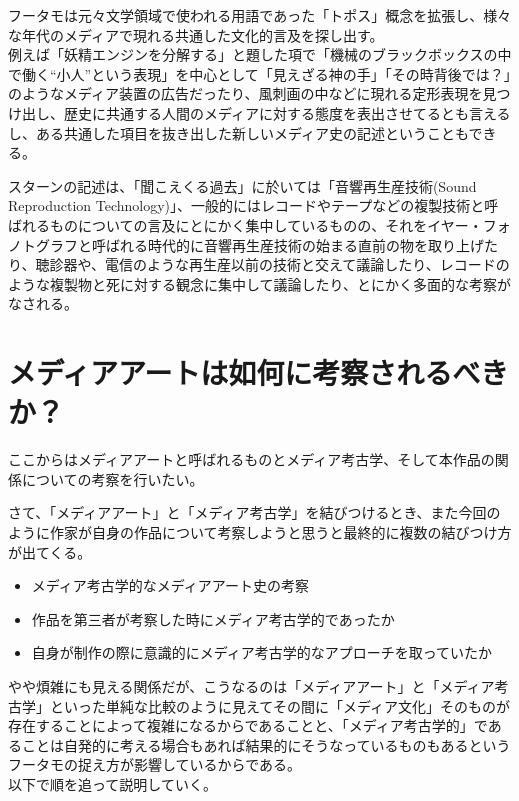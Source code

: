 \documentclass[a4paper,report]{jsbook}
\begin{document}
フータモは元々文学領域で使われる用語であった「トポス」概念を拡張し、様々な年代のメディアで現れる共通した文化的言及を探し出す。\\
例えば「妖精エンジンを分解する」と題した項で「機械のブラックボックスの中で働く``小人''という表現」を中心として「見えざる神の手」「その時背後では？」のようなメディア装置の広告だったり、風刺画の中などに現れる定形表現を見つけ出し、歴史に共通する人間のメディアに対する態度を表出させてるとも言えるし、ある共通した項目を抜き出した新しいメディア史の記述ということもできる。

スターンの記述は、「聞こえくる過去」に於いては「音響再生産技術(Sound
Reproduction
Technology)」、一般的にはレコードやテープなどの複製技術と呼ばれるものについての言及にとにかく集中しているものの、それをイヤー・フォノトグラフと呼ばれる時代的に音響再生産技術の始まる直前の物を取り上げたり、聴診器や、電信のような再生産以前の技術と交えて議論したり、レコードのような複製物と死に対する観念に集中して議論したり、とにかく多面的な考察がなされる。

\section{メディアアートは如何に考察されるべきか？}\label{ux30e1ux30c7ux30a3ux30a2ux30a2ux30fcux30c8ux306fux5982ux4f55ux306bux8003ux5bdfux3055ux308cux308bux3079ux304dux304b}

ここからはメディアアートと呼ばれるものとメディア考古学、そして本作品の関係についての考察を行いたい。

さて、「メディアアート」と「メディア考古学」を結びつけるとき、また今回のように作家が自身の作品について考察しようと思うと最終的に複数の結びつけ方が出てくる。

\begin{itemize}
\tightlist
\item
  メディア考古学的なメディアアート史の考察
\item
  作品を第三者が考察した時にメディア考古学的であったか
\item
  自身が制作の際に意識的にメディア考古学的なアプローチを取っていたか
\end{itemize}

やや煩雑にも見える関係だが、こうなるのは「メディアアート」と「メディア考古学」といった単純な比較のように見えてその間に「メディア文化」そのものが存在することによって複雑になるからであることと、「メディア考古学的」であることは自発的に考える場合もあれば結果的にそうなっているものもあるというフータモの捉え方が影響しているからである。\\
以下で順を追って説明していく。
\end{document}
